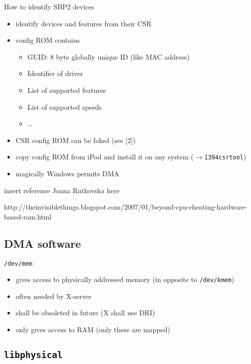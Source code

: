 \documentclass{beamer}
\newenvironment{itemizeframe}[1]
  {\begin{frame}{#1}\startitemizeframe}
  {\stopitemizeframe\end{frame}}
\newcommand\startitemizeframe{\begin{itemize}}
\newcommand\stopitemizeframe{\end{itemize}}
\begin{document}
		\begin{itemizeframe}{How to identify SBP2 devices}
			\item identify devices and features from their CSR 
			\item config ROM contains
			\begin{itemize}
				\item GUID: 8 byte globally unique ID (like MAC address)
				\item Identifier of driver
				\item List of supported features
				\item List of supported speeds
				\item \ldots
			\end{itemize}
			\item<2-> CSR config ROM can be faked (see [2])
			\item<3-> copy config ROM from iPod and install it on any system ($\rightarrow$\texttt{1394csrtool})
			\item<4-> magically Windows permits DMA
		\end{itemizeframe}

		\begin{frame}
			\alert{insert reference Joana Rutkovska here}

			http://theinvisiblethings.blogspot.com/2007/01/beyond-cpu-cheating-hardware-based-ram.html
		\end{frame}
		
	\subsection{DMA software}

		\begin{itemizeframe}{\texttt{/dev/mem}}
			\item gives access to physically addressed memory (in opposite to \texttt{/dev/kmem})
			\item often needed by X-server
			\item shall be obsoleted in future (X shall use DRI)
			\item only gives access to  RAM (only these are mapped)
		\end{itemizeframe}

	\subsection{\texttt{libphysical}}
\end{document}
